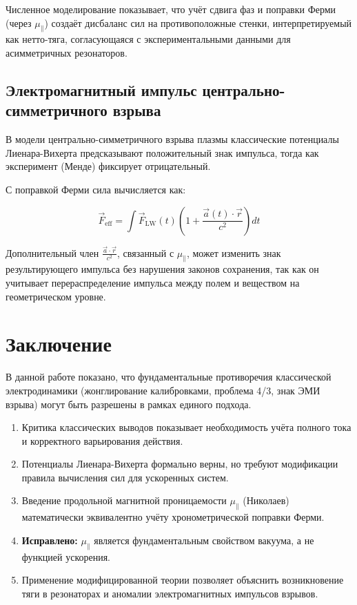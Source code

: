 \documentclass[12pt, a4paper]{article}
\begin{document}
Численное моделирование показывает, что учёт сдвига фаз и поправки Ферми (через $\mu_{\parallel}$) создаёт дисбаланс сил на противоположные стенки, интерпретируемый как нетто-тяга, согласующаяся с экспериментальными данными для асимметричных резонаторов.

\subsection{Электромагнитный импульс центрально-симметричного взрыва}

В модели центрально-симметричного взрыва плазмы классические потенциалы Лиенара-Вихерта предсказывают положительный знак импульса, тогда как эксперимент (Менде) фиксирует отрицательный.

С поправкой Ферми сила вычисляется как:

\begin{equation}
\vec{F}_{\text{eff}} = \int \vec{F}_{\text{LW}}(t) \left( 1 + \frac{\vec{a}(t) \cdot \vec{r}}{c^2} \right) dt
\label{eq:fermi_force_full}
\end{equation}

Дополнительный член $\frac{\vec{a} \cdot \vec{r}}{c^2}$, связанный с $\mu_{\parallel}$, может изменить знак результирующего импульса без нарушения законов сохранения, так как он учитывает перераспределение импульса между полем и веществом на геометрическом уровне.

\section{Заключение}

В данной работе показано, что фундаментальные противоречия классической электродинамики (жонглирование калибровками, проблема 4/3, знак ЭМИ взрыва) могут быть разрешены в рамках единого подхода.

\begin{enumerate}
    \item Критика классических выводов показывает необходимость учёта полного тока и корректного варьирования действия.
    \item Потенциалы Лиенара-Вихерта формально верны, но требуют модификации правила вычисления сил для ускоренных систем.
    \item Введение продольной магнитной проницаемости $\mu_{\parallel}$ (Николаев) математически эквивалентно учёту хронометрической поправки Ферми.
    \item \textbf{Исправлено:} $\mu_{\parallel}$ является фундаментальным свойством вакуума, а не функцией ускорения.
    \item Применение модифицированной теории позволяет объяснить возникновение тяги в резонаторах и аномалии электромагнитных импульсов взрывов.
\end{enumerate}
\end{document}
